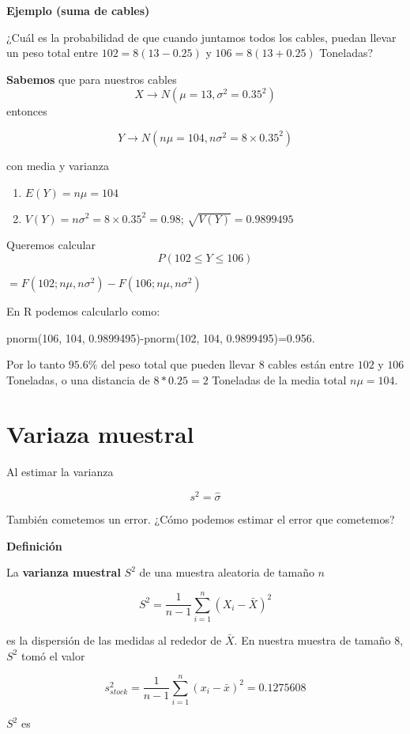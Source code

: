 \documentclass[
]{book}
\providecommand{\tightlist}{%
  \setlength{\itemsep}{0pt}\setlength{\parskip}{0pt}}
\begin{document}
\textbf{Ejemplo (suma de cables)}

¿Cuál es la probabilidad de que cuando juntamos todos los cables, puedan llevar un peso total entre \(102=8(13 - 0.25)\) y \(106=8(13+ 0.25)\) Toneladas?

\textbf{Sabemos} que para nuestros cables \[X \rightarrow N(\mu=13, \sigma^2=0.35^2)\] entonces

\[Y \rightarrow N(n\mu=104, n\sigma^2=8\times 0.35^2)\]

con media y varianza

\begin{enumerate}
\def\labelenumi{\arabic{enumi})}
\tightlist
\item
  \(E(Y)=n\mu=104\)
\item
  \(V(Y)=n\sigma^2=8\times 0.35^2=0.98\); \(\sqrt{V(Y)}=0.9899495\)
\end{enumerate}

Queremos calcular \[P(102 \leq Y \leq 106)\]

\(=F(102; n\mu, n\sigma^2)-F(106; n\mu, n\sigma^2)\)

En R podemos calcularlo como:

pnorm(106, 104, 0.9899495)-pnorm(102, 104, 0.9899495)=0.956.

Por lo tanto \(95.6\%\) del peso total que pueden llevar \(8\) cables están entre \(102\) y \(106\) Toneladas, o una distancia de \(8*0.25=2\) Toneladas de la media total \(n\mu=104\).

\hypertarget{variaza-muestral}{%
\section{Variaza muestral}\label{variaza-muestral}}

Al estimar la varianza

\[s^2=\hat{\sigma}\]

También cometemos un error. ¿Cómo podemos estimar el error que cometemos?

\textbf{Definición}

La \textbf{varianza muestral} \(S^2\) de una muestra aleatoria de tamaño \(n\)

\[S^2= \frac{1}{n-1}\sum_{i=1}^n (X_i-\bar{X})^2\]

es la dispersión de las medidas al rededor de \(\bar{X}\). En nuestra muestra de tamaño \(8\), \(S^2\) tomó el valor

\[s_{stock}^2=\frac{1}{n-1}\sum_{i=1}^n (x_i-\bar{x})^2=0.1275608\]

\(S^2\) es
\end{document}
